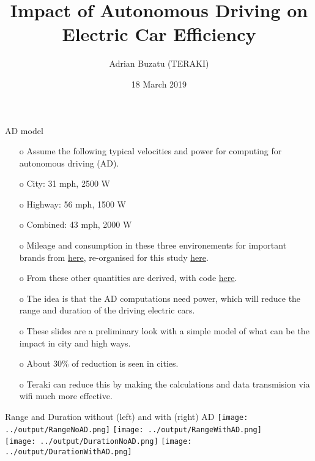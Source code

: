 \documentclass{beamer}
\title[AD impact on electric car efficiency]{Impact of Autonomous Driving on Electric Car Efficiency}
\author[Adrian Buzatu (TERAKI) ]{Adrian Buzatu (TERAKI)}
\date{18 March 2019}
\begin{document}

\frame{\titlepage} 
\def \AdrianSize {0.45}
\def \AdrianSizeOne {0.95}



\begin{frame}{AD model}
\begin{enumerate}
\item[o] Assume the following typical velocities and power for computing for autonomous driving (AD).
\item[o] City: 31 mph, 2500 W
\item[o] Highway: 56 mph, 1500 W
\item[o] Combined: 43 mph, 2000 W
\item[o] Mileage and consumption in these three environements for important brands from \href{https://pushevs.com/electric-car-range-efficiency-epa/}{here}, re-organised for this study \href{https://gitlab.cern.ch/abuzatu/BuzatuPython/blob/master/examples/teraki/electricCarEfficiency/input/data.txt}{here}.
\item[o] From these other quantities are derived, with code \href{https://gitlab.cern.ch/abuzatu/BuzatuPython/blob/master/examples/teraki/electricCarEfficiency/electricCarEfficiency.py}{here}.
\item[o] The idea is that the AD computations need power, which will reduce the range and duration of the driving electric cars.
\item[o] These slides are a preliminary look with a simple model of what can be the impact in city and high ways.
\item[o] About 30\% of reduction is seen in cities. 
\item[o] Teraki can reduce this by making the calculations and data transmision via wifi much more effective.
\end{enumerate}
\end{frame}

\begin{frame}{Range and Duration without (left) and with (right) AD}
\centering
\texttt{[image: ../output/RangeNoAD.png]}
\texttt{[image: ../output/RangeWithAD.png]}\\
\texttt{[image: ../output/DurationNoAD.png]}
\texttt{[image: ../output/DurationWithAD.png]}\\
\end{frame}
\end{document}
